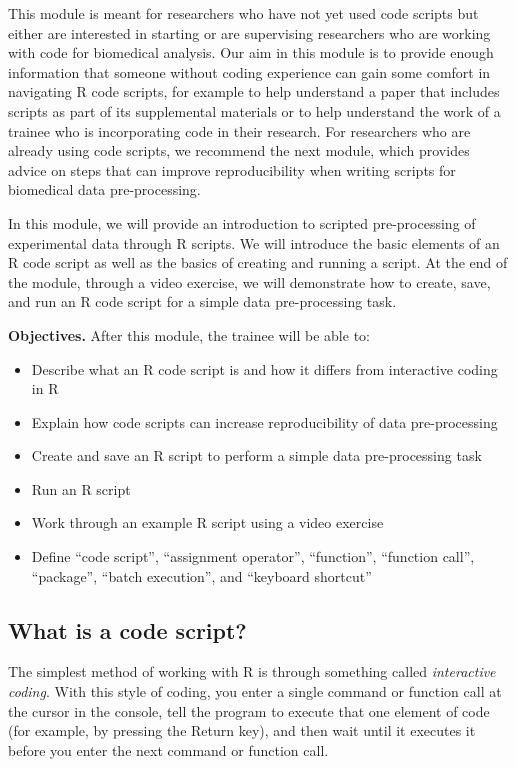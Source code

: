 \documentclass[]{tufte-book}
\providecommand{\tightlist}{%
  \setlength{\itemsep}{0pt}\setlength{\parskip}{0pt}}
\begin{document}
This module is meant for researchers who have not yet used code scripts but either
are interested in starting or are supervising researchers who are working
with code for biomedical analysis. Our aim in this module is to provide enough
information that someone without coding experience can gain some comfort in
navigating R code scripts, for example to help understand a paper that includes
scripts as part of its supplemental materials or to help understand the work of
a trainee who is incorporating code in their research. For researchers who are
already using code scripts, we recommend the next module, which provides
advice on steps that can improve reproducibility when writing scripts for
biomedical data pre-processing.

In this module, we will provide an introduction to scripted pre-processing of
experimental data through R scripts. We will introduce the basic elements of an
R code script as well as the basics of creating and running a script. At the end
of the module, through a video exercise, we will demonstrate how to create,
save, and run an R code script for a simple data pre-processing task.

\textbf{Objectives.} After this module, the trainee will be able to:

\begin{itemize}
\tightlist
\item
  Describe what an R code script is and how it differs from interactive
  coding in R
\item
  Explain how code scripts can increase reproducibility of data pre-processing
\item
  Create and save an R script to perform a simple data pre-processing task
\item
  Run an R script
\item
  Work through an example R script using a video exercise
\item
  Define ``code script'', ``assignment operator'', ``function'', ``function call'',
  ``package'', ``batch execution'', and ``keyboard shortcut''
\end{itemize}

\subsection{What is a code script?}\label{what-is-a-code-script}

The simplest method of working with R is through something called \emph{interactive
coding}. With this style of coding, you enter a single command or function call
at the cursor in the console, tell the program to execute that one element of
code (for example, by pressing the Return key), and then wait until it executes
it before you enter the next command or function call.
\end{document}
